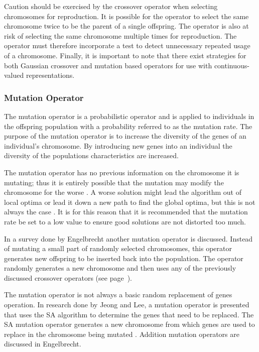 Caution should be exercised by the crossover operator when selecting chromosomes for reproduction. It is possible for the operator to select the same chromosome twice to be the parent of a single offspring\cite{CompuIntelligenceIntro}. The operator is also at risk of selecting the same chromosome multiple times for reproduction\cite{CompuIntelligenceIntro}. The operator must therefore incorporate a test to detect unnecessary repeated usage of a chromosome\cite{CompuIntelligenceIntro}. Finally, it is important to note that there exist strategies for both Gaussian crossover and mutation based operators for use with continuous-valued representations\cite{FundamentalSwarm}.

\subsubsection{Mutation Operator}
\label{sec:mutation}
The mutation operator is a probabilistic operator and is applied to individuals in the offspring population with a probability referred to as the mutation rate\cite{CompuIntelligenceIntro}. The purpose of the mutation operator is to increase the diversity of the genes of an individual's chromosome\cite{CompuIntelligenceIntro}. By introducing new genes into an individual the diversity of the populations characteristics are increased\cite{CoactiveFuzzyGA,AcceleratingGA,ConstrainedGA}.

The mutation operator has no previous information on the chromosome it is mutating; thus it is entirely possible that the mutation may modify the chromosome for the worse \cite{AcceleratingGA}. A worse solution might lead the algorithm out of local optima or lead it down a new path to find the global optima, but this is not always the case \cite{AdaptiveSAGA,FamilyGA,ConstrainedGA}. It is for this reason that it is recommended that the mutation rate be set to a low value to ensure good solutions are not distorted too much\cite{CompuIntelligenceIntro}.

In a survey done by Engelbrecht\cite{CompuIntelligenceIntro} another mutation operator is discussed. Instead of mutating a small part of randomly selected chromosomes, this operator generates new offspring to be inserted back into the population. The operator randomly generates a new chromosome and then uses any of the previously discussed crossover operators (see page~\pageref{sec:crossover}).

The mutation operator is not always a basic random replacement of genes operation. In research done by Jeong and Lee\cite{AdaptiveSAGA}, a mutation operator is presented that uses the \gls{SA} algorithm to determine the genes that need to be replaced. The \gls{SA} mutation operator generates a new chromosome from which genes are used to replace in the chromosome being mutated \cite{AdaptiveSAGA}. Addition mutation operators are discussed in Engelbrecht\cite{CompuIntelligenceIntro}.
